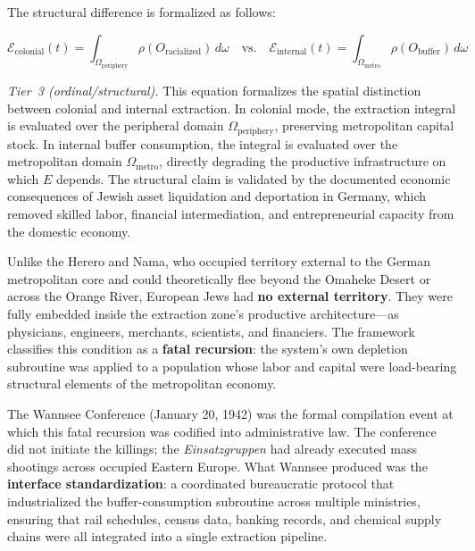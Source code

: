 The structural difference is formalized as follows:

\begin{equation}\label{eq:german-extraction-modes}
\mathcal{E}_{\text{colonial}}(t) = \int_{\Omega_{\text{periphery}}} \rho(O_{\text{racialized}}) \, d\omega \quad \text{vs.} \quad \mathcal{E}_{\text{internal}}(t) = \int_{\Omega_{\text{metro}}} \rho(O_{\text{buffer}}) \, d\omega
\end{equation}

\noindent\textit{Tier~3 (ordinal/structural).} This equation formalizes the spatial distinction between colonial and internal extraction. In colonial mode, the extraction integral is evaluated over the peripheral domain $\Omega_{\text{periphery}}$, preserving metropolitan capital stock. In internal buffer consumption, the integral is evaluated over the metropolitan domain $\Omega_{\text{metro}}$, directly degrading the productive infrastructure on which $E$ depends. The structural claim is validated by the documented economic consequences of Jewish asset liquidation and deportation in Germany, which removed skilled labor, financial intermediation, and entrepreneurial capacity from the domestic economy.

Unlike the Herero and Nama, who occupied territory external to the German metropolitan core and could theoretically flee beyond the Omaheke Desert or across the Orange River, European Jews had \textbf{no external territory}. They were fully embedded inside the extraction zone's productive architecture---as physicians, engineers, merchants, scientists, and financiers. The framework classifies this condition as a \textbf{fatal recursion}: the system's own depletion subroutine was applied to a population whose labor and capital were load-bearing structural elements of the metropolitan economy.

The Wannsee Conference (January 20, 1942) was the formal compilation event at which this fatal recursion was codified into administrative law. The conference did not initiate the killings; the \textit{Einsatzgruppen} had already executed mass shootings across occupied Eastern Europe. What Wannsee produced was the \textbf{interface standardization}: a coordinated bureaucratic protocol that industrialized the buffer-consumption subroutine across multiple ministries, ensuring that rail schedules, census data, banking records, and chemical supply chains were all integrated into a single extraction pipeline.

